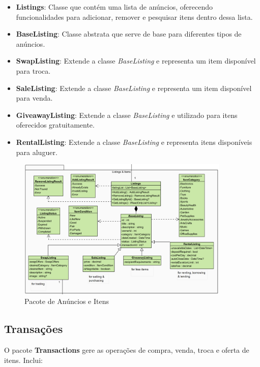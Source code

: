 \documentclass[a4paper, 12pt]{article} %
\begin{document}
\begin{itemize}
	\item \textbf{Listings}: Classe que contém uma lista de anúncios, oferecendo funcionalidades para adicionar, remover e pesquisar itens dentro dessa lista.
	\item \textbf{BaseListing}: Classe abstrata que serve de base para diferentes tipos de anúncios.
	\item \textbf{SwapListing}: Extende a classe \textit{BaseListing} e representa um item disponível para troca.
	\item \textbf{SaleListing}: Extende a classe \textit{BaseListing} e representa um item disponível para venda.
	\item \textbf{GiveawayListing}: Extende a classe \textit{BaseListing} e utilizado para itens oferecidos gratuitamente.
	\item \textbf{RentalListing}: Extende a classe \textit{BaseListing} e representa itens disponíveis para aluguer.
\end{itemize}

\begin{figure}[ht]
	\centering
	\includegraphics[width=0.9\textwidth]{diagrama_classes_anuncios_itens.png}
	\caption{Pacote de Anúncios e Itens}
	\label{fig:diagrama_classes_anuncios_itens}
\end{figure}

\subsection{Transações}

O pacote \textbf{Transactions} gere as operações de compra, venda, troca e oferta de itens. Inclui:
\end{document}
